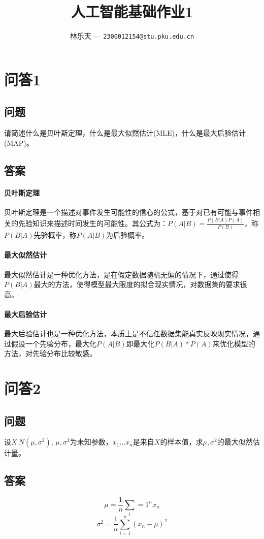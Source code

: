 \documentclass[UTF8]{ctexart}
\title{
	人工智能基础作业1
}
\author{
	林乐天 --- \texttt{2300012154@stu.pku.edu.cn}
}
\begin{document}
\maketitle
\section{问答1}
\subsection{问题}请简述什么是贝叶斯定理，什么是最大似然估计(MLE)，什么是最大后验估计
(MAP)。
\subsection{答案}

\paragraph{贝叶斯定理}贝叶斯定理是一个描述对事件发生可能性的信心的公式，基于对已有可能与事件相关的先验知识来描述时间发生的可能性。其公式为：$P(A|B)=\frac{P(B|A)P(A)}{P(B)}$，称$P(B|A)$先验概率，称$P(A|B)$为后验概率。

\paragraph{最大似然估计}最大似然估计是一种优化方法，是在假定数据随机无偏的情况下，通过使得$P(B|A)$最大的方法，使得模型最大限度的拟合现实情况，对数据集的要求很高。

\paragraph{最大后验估计}最大后验估计也是一种优化方法，本质上是不信任数据集能真实反映现实情况，通过假设一个先验分布，最大化$P(A|B)$即最大化$P(B|A)*P(A)$来优化模型的方法，对先验分布比较敏感。

\section{问答2}
\subsection{问题}
设$X~N(\mu, \sigma^2)$, $\mu,\sigma^2$为未知参数，$x_1\dots x_n$是来自$X$的样本值，求$\mu,\sigma^2$的最大似然估计量。
\subsection{答案}$$\mu = \frac{1}{n}\sum_i={1}^n x_n$$
$$\sigma^2 = \frac{1}{n}\sum_{i=1}^n(x_n - \mu)^2$$
\end{document}
